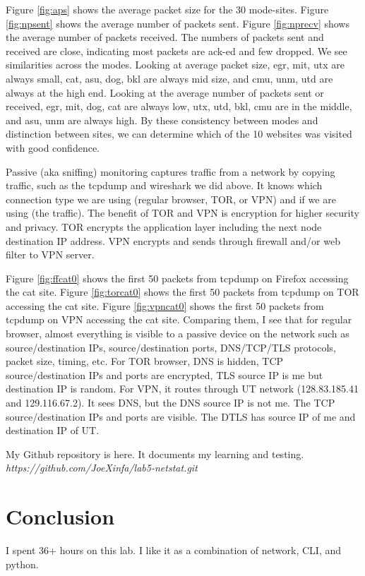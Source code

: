 \documentclass[11pt]{article}
\begin{document}
Figure \ref{fig:aps} shows the average packet size for the 30 mode-sites.
Figure \ref{fig:npsent} shows the average number of packets sent.
Figure \ref{fig:nprecv} shows the average number of packets received.
The numbers of packets sent and received are close,
indicating most packets are ack-ed and few dropped.
We see similarities across the modes.
Looking at average packet size, egr, mit, utx are always small,
cat, asu, dog, bkl are always mid size, and
cmu, unm, utd are always at the high end.
Looking at the average number of packets sent or received,
egr, mit, dog, cat are always low,
utx, utd, bkl, cmu are in the middle, and
asu, unm are always high.
By these consistency between modes and distinction between sites,
we can determine which of the 10 websites was visited with good confidence.

Passive (aka sniffing) monitoring captures traffic from a network
by copying traffic, such as the tcpdump and wireshark we did above.
It knows which connection type we are using (regular browser, TOR, or VPN)
and if we are using (the traffic).
The benefit of TOR and VPN is encryption for higher security and privacy.
TOR encrypts the application layer including the next node destination IP address.
VPN encrypts and sends through firewall and/or web filter to VPN server.

Figure \ref{fig:ffcat0} shows the first 50
packets from tcpdump on Firefox accessing the cat site.
Figure \ref{fig:torcat0} shows the first 50
packets from tcpdump on TOR accessing the cat site.
Figure \ref{fig:vpncat0} shows the first 50
packets from tcpdump on VPN accessing the cat site.
Comparing them, I see that for regular browser, almost everything is visible to
a passive device on the network such as source/destination IPs,
source/destination ports, DNS/TCP/TLS protocols, packet size, timing, etc.
For TOR browser, DNS is hidden, TCP source/destination IPs and ports
are encrypted, TLS source IP is me but destination IP is random.
For VPN, it routes through UT network (128.83.185.41 and 129.116.67.2).
It sees DNS, but the DNS source IP is not me.
The TCP source/destination IPs and ports are visible.
The DTLS has source IP of me and destination IP of UT.


My Github repository is here. It documents my learning and testing. \\
\textit{https://github.com/JoeXinfa/lab5-netstat.git}

\section{Conclusion}
\label{sec:conclusion}
I spent 36+ hours on this lab. I like it as a combination of
network, CLI, and python.
\end{document}

